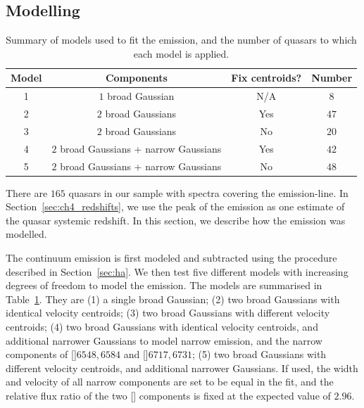 \subsection{Modelling \hans}
\label{sec:hamodel}

\begin{table}
  \centering
  \footnotesize
    \begin{tabular}{cccc}
    \hline
    Model     & Components & Fix centroids? & Number \\
    \hline
    1        & $1$ broad Gaussian  & N/A &  $8$ \\
    2        & $2$ broad Gaussians & Yes &  $47$ \\
    3        & $2$ broad Gaussians & No  &  $20$ \\
    4        & $2$ broad Gaussians + narrow Gaussians & Yes & $42$ \\
    5        & $2$ broad Gaussians + narrow Gaussians & No  & $48$ \\
    \hline
    \end{tabular}
    \caption[{Summary of models used to fit the \ha emission, and the number of quasars to which each model is applied.}]{Summary of models used to fit the \ha emission, and the number of quasars to which each model is applied.}
  \label{tab:hamod}
\end{table}

There are $165$ quasars in our sample with spectra covering the \ha emission-line.
In Section~\ref{sec:ch4_redshifts}, we use the peak of the \ha emission as one estimate of the quasar systemic redshift.
In this section, we describe how the \ha emission was modelled.

The continuum emission is first modeled and subtracted using the procedure described in Section~\ref{sec:ha}.
We then test five different models with increasing degrees of freedom to model the \ha emission.
The models are summarised in Table~\ref{tab:hamod}.
They are (1) a single broad Gaussian; (2) two broad Gaussians with identical velocity centroids; (3) two broad Gaussians with different velocity centroids; (4) two broad Gaussians with identical velocity centroids, and additional narrower Gaussians to model narrow \ha emission, and the narrow components of []\ll$6548,6584$ and []\ll$6717,6731$; (5) two broad Gaussians with different velocity centroids, and additional narrower Gaussians.
If used, the width and velocity of all narrow components are set to be equal in the fit, and the relative flux ratio of the two [] components is fixed at the expected value of $2.96$.

